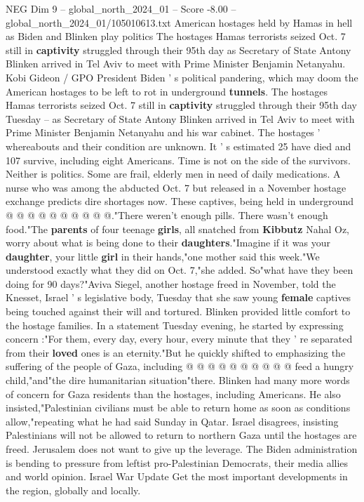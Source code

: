 \begin{textsample}{NEG Dim 9 – global\_north\_2024\_01 – Score -8.00 – global\_north\_2024\_01/105010613.txt}  \label{ex:f9_neg_191}
American hostages held by Hamas in hell as Biden and Blinken play politics The hostages Hamas terrorists seized Oct. 7 still in \textbf{captivity} struggled through their 95th day as Secretary of State Antony Blinken arrived in Tel Aviv to meet with Prime Minister Benjamin Netanyahu.
Kobi Gideon / GPO President Biden ' s political pandering, which may doom the American hostages to be left to rot in underground \textbf{tunnels}.
The hostages Hamas terrorists seized Oct. 7 still in \textbf{captivity} struggled through their 95th day Tuesday -- as Secretary of State Antony Blinken arrived in Tel Aviv to meet with Prime Minister Benjamin Netanyahu and his war cabinet.
The hostages ' whereabouts and their condition are unknown.
It ' s estimated 25 have died and 107 survive, including eight Americans.
Time is not on the side of the survivors.
Neither is politics.
Some are frail, elderly men in need of daily medications.
A nurse who was among the abducted Oct. 7 but released in a November hostage exchange predicts dire shortages now.
These captives, being held in underground @ @ @ @ @ @ @ @ @ @."There weren't enough pills.
There wasn't enough food."The \textbf{parents} of four teenage \textbf{girls}, all snatched from \textbf{Kibbutz} Nahal Oz, worry about what is being done to their \textbf{daughters}."Imagine if it was your \textbf{daughter}, your little \textbf{girl} in their hands,"one mother said this week."We understood exactly what they did on Oct. 7,"she added.
So"what have they been doing for 90 days?"Aviva Siegel, another hostage freed in November, told the Knesset, Israel ' s legislative body, Tuesday that she saw young \textbf{female} captives being touched against their will and tortured.
Blinken provided little comfort to the hostage families.
In a statement Tuesday evening, he started by expressing concern :"For them, every day, every hour, every minute that they ' re separated from their \textbf{loved} ones is an eternity."But he quickly shifted to emphasizing the suffering of the people of Gaza, including @ @ @ @ @ @ @ @ @ @ feed a hungry child,"and"the dire humanitarian situation"there.
Blinken had many more words of concern for Gaza residents than the hostages, including Americans.
He also insisted,"Palestinian civilians must be able to return home as soon as conditions allow,"repeating what he had said Sunday in Qatar.
Israel disagrees, insisting Palestinians will not be allowed to return to northern Gaza until the hostages are freed.
Jerusalem does not want to give up the leverage.
The Biden administration is bending to pressure from leftist pro-Palestinian Democrats, their media allies and world opinion.
Israel War Update Get the most important developments in the region, globally and locally.

\end{textsample}

